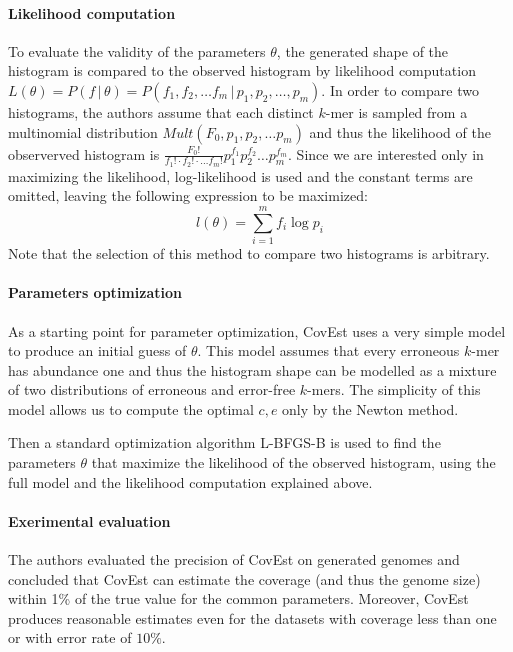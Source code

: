 \paragraph{Likelihood computation}
To evaluate the validity of the parameters $\theta$, the generated shape of the histogram is
compared to the observed histogram by likelihood computation
$L(\theta) = P(f\,|\,\theta) = P(f_1, f_2, \dots f_m\,|\,p_1, p_2, \dots, p_m)$. In order to
compare two histograms, the authors assume that each distinct $k$-mer is sampled
from a multinomial distribution $Mult(F_0, p_1, p_2, \dots p_m)$ and thus the
likelihood of the observerved histogram is 
$\frac{F_0!}{f_1! \cdot f_2! \cdot \dots f_m!} p_1^{f_1} p_2^{f_2} \dots p_m ^{f_m}$.
Since we are interested only in maximizing the likelihood, log-likelihood is used and
the constant terms are omitted, leaving the following expression to be maximized:
\begin{equation} \label{eq:covest-likelihood}
l(\theta) = \sum_{i=1}^m f_i \log p_i
\end{equation}
Note that the selection of this method to compare two histograms is arbitrary.

\paragraph{Parameters optimization}
As a starting point for parameter optimization, CovEst uses a very simple model
to produce an initial guess of $\theta$. This model assumes that every
erroneous $k$-mer has abundance one and thus the histogram shape can be modelled
as a mixture of two distributions of erroneous and error-free $k$-mers. The
simplicity of this model allows us to compute the optimal $c, e$ only by the Newton method.

Then a standard optimization algorithm L-BFGS-B is used to find the parameters $\theta$
that maximize the likelihood of the observed histogram, using the full model and the
likelihood computation explained above.

\paragraph{Exerimental evaluation}
The authors evaluated the precision of CovEst on generated genomes \cite{Hozza2015}
and concluded that CovEst can estimate the coverage (and thus the genome size) within 1\% 
of the true value for the common parameters. Moreover, CovEst produces reasonable
estimates even for the datasets with coverage less than one or with error rate of $10\%$.
